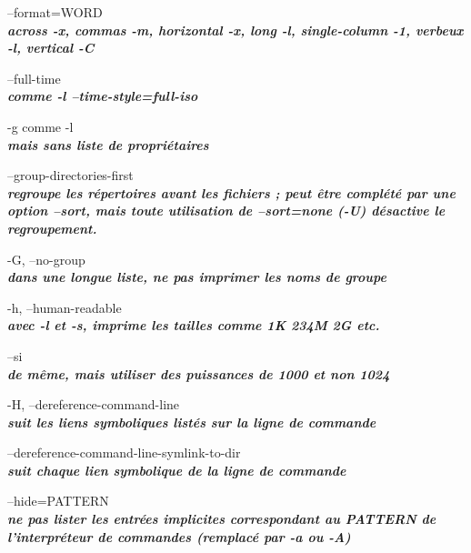 \documentclass{article}
\begin{document}
       \par --format=WORD\\
              \textit{\textbf{across -x, commas -m, horizontal -x, long -l, single-column -1,
              verbeux -l, vertical -C}}\\

       \par --full-time\\
              \textit{\textbf{comme -l --time-style=full-iso}}\\

       \par-g comme -l\\
	 \textit{\textbf{mais sans liste de propriétaires}}\\

       \par --group-directories-first\\
              \textit{\textbf{regroupe les répertoires avant les fichiers ;
		peut être complété par une option --sort, mais toute utilisation de
              --sort=none (-U) désactive le regroupement.}}\\

       \par -G, --no-group\\
               \textit{\textbf{dans une longue liste, ne pas imprimer les noms de groupe}}\\

       \par-h, --human-readable\\
               \textit{\textbf{avec -l et -s, imprime les tailles comme 1K 234M 2G etc.}}\\

       \par--si \\
		 \textit{\textbf{de même, mais utiliser des puissances de 1000 et non 1024}}\\

        \par-H, --dereference-command-line\\
              \textit{\textbf{suit les liens symboliques listés sur la ligne de commande}}\\

      \par --dereference-command-line-symlink-to-dir\\
              \textit{\textbf{suit chaque lien symbolique de la ligne de commande}}\\

              
       \par--hide=PATTERN\\
              \textit{\textbf{ne pas lister les entrées implicites correspondant au PATTERN de l'interpréteur de commandes (remplacé
              par -a ou -A)}}\\
\end{document}
